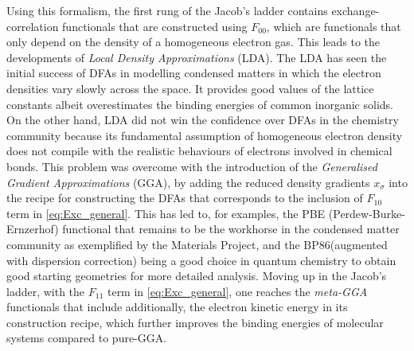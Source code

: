 Using this formalism, the first rung of the Jacob's ladder contains exchange-correlation functionals that are constructed using $F_{00}$, which are functionals that only depend on the density of a homogeneous electron gas. This leads to the developments of \emph{Local Density Approximations} (LDA). The LDA has seen the initial success of DFAs in modelling condensed matters in which the electron densities vary slowly across the space. It provides good  values of the lattice constants albeit overestimates the binding energies of common inorganic solids.\cite{stampfl1999density} On the other hand, LDA did not win the confidence over DFAs in the chemistry community because its fundamental assumption of homogeneous electron density does not compile with the realistic behaviours of electrons involved in chemical bonds. This problem was overcome with the introduction of the \emph{Generalised Gradient Approximations} (GGA), by adding the reduced density gradients $x_\sigma$ into the recipe for constructing the DFAs that corresponds to the inclusion of $F_{10}$ term in \cref{eq:Exc_general}.  This has led to, for examples, the  PBE (Perdew-Burke-Ernzerhof)\cite{perdew1996generalized} functional that remains to be the workhorse in the condensed matter community as exemplified by the Materials Project,\cite{jain2013commentary} and the BP86\cite{becke1988density,perdew1986density}(augmented with dispersion correction) being a good choice in quantum chemistry to obtain good starting geometries for  more detailed analysis. Moving up in the Jacob's ladder,  with the $F_{11}$  term in \cref{eq:Exc_general}, one reaches the \emph{meta-GGA} functionals that include additionally, the electron kinetic energy in its construction recipe, which further improves the binding energies of molecular systems compared to pure-GGA.\cite{perdew1999accurate} 

